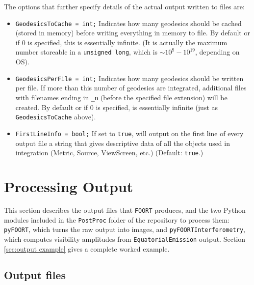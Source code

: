 \documentclass[11pt,a4paper]{article}
\newcommand{\code}[1]{{\tt #1}}
\begin{document}
The options that further specify details of the actual output written to files are:
\begin{itemize}
 \item \code{GeodesicsToCache = int;} \newline Indicates how many geodesics should be cached (stored in memory) before writing everything in memory to file. By default or if 0 is specified, this is essentially infinite. (It is actually the maximum number storeable in a \code{unsigned long}, which is $\sim 10^{9}-10^{19}$, depending on OS).
 \item \code{GeodesicsPerFile = int;} \newline Indicates how many geodesics should be written per file. If more than this number of geodesics are integrated, additional files with filenames ending in \code{\_n} (before the specified file extension) will be created. By default or if 0 is specified, is essentially infinite (just as \code{GeodesicsToCache} above).
 \item \code{FirstLineInfo = bool;} \newline If set to \code{true}, will output on the first line of every output file a string that gives descriptive data of all the objects used in integration (Metric, Source, ViewScreen, etc.) (Default: \code{true}.)
\end{itemize}



\section{Processing Output}

This section describes the output files that \code{FOORT} produces, and the two Python modules included in the \code{PostProc} folder of the repository to process them: \code{pyFOORT}, which turns the raw output into images, and \code{pyFOORTInterferometry}, which computes visibility amplitudes from \code{EquatorialEmission} output. Section \ref{sec:output example} gives a complete worked example.

\subsection{Output files}\label{sec:output files}
\end{document}
